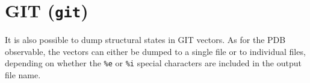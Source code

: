 \section{GIT (\texttt{git})}
\label{sec:observable-git}

It is also possible to dump structural states in GIT vectors. As for
the PDB observable, the vectors can either be dumped to a single file
or to individual files, depending on whether the \texttt{\%e} or
\texttt{\%i} special characters are included in the output file name.

